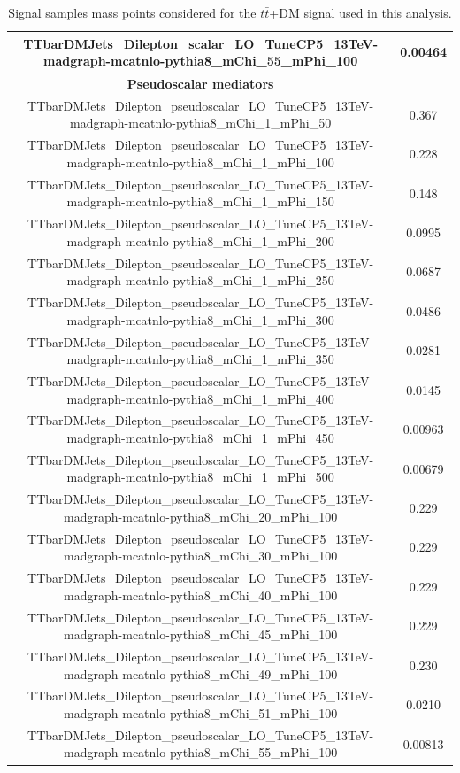 \documentclass[a4paper, 10pt, openright]{report}
\begin{document}
\begin{appendices}
\begin{table}
\begin{center}
{\begin{tabular}{ c|c }
 TTbarDMJets\_Dilepton\_scalar\_LO\_TuneCP5\_13TeV-madgraph-mcatnlo-pythia8\_mChi\_55\_mPhi\_100 & 0.00464 \\
 \hline
\textbf{Pseudoscalar mediators} & \\
 TTbarDMJets\_Dilepton\_pseudoscalar\_LO\_TuneCP5\_13TeV-madgraph-mcatnlo-pythia8\_mChi\_1\_mPhi\_50 & 0.367 \\
 TTbarDMJets\_Dilepton\_pseudoscalar\_LO\_TuneCP5\_13TeV-madgraph-mcatnlo-pythia8\_mChi\_1\_mPhi\_100 & 0.228 \\
 TTbarDMJets\_Dilepton\_pseudoscalar\_LO\_TuneCP5\_13TeV-madgraph-mcatnlo-pythia8\_mChi\_1\_mPhi\_150 & 0.148 \\
 TTbarDMJets\_Dilepton\_pseudoscalar\_LO\_TuneCP5\_13TeV-madgraph-mcatnlo-pythia8\_mChi\_1\_mPhi\_200 & 0.0995 \\
 TTbarDMJets\_Dilepton\_pseudoscalar\_LO\_TuneCP5\_13TeV-madgraph-mcatnlo-pythia8\_mChi\_1\_mPhi\_250 & 0.0687 \\
 TTbarDMJets\_Dilepton\_pseudoscalar\_LO\_TuneCP5\_13TeV-madgraph-mcatnlo-pythia8\_mChi\_1\_mPhi\_300 & 0.0486 \\
 TTbarDMJets\_Dilepton\_pseudoscalar\_LO\_TuneCP5\_13TeV-madgraph-mcatnlo-pythia8\_mChi\_1\_mPhi\_350 & 0.0281 \\
 TTbarDMJets\_Dilepton\_pseudoscalar\_LO\_TuneCP5\_13TeV-madgraph-mcatnlo-pythia8\_mChi\_1\_mPhi\_400 & 0.0145 \\
 TTbarDMJets\_Dilepton\_pseudoscalar\_LO\_TuneCP5\_13TeV-madgraph-mcatnlo-pythia8\_mChi\_1\_mPhi\_450 & 0.00963 \\
 TTbarDMJets\_Dilepton\_pseudoscalar\_LO\_TuneCP5\_13TeV-madgraph-mcatnlo-pythia8\_mChi\_1\_mPhi\_500 & 0.00679 \\
 TTbarDMJets\_Dilepton\_pseudoscalar\_LO\_TuneCP5\_13TeV-madgraph-mcatnlo-pythia8\_mChi\_20\_mPhi\_100 & 0.229 \\
 TTbarDMJets\_Dilepton\_pseudoscalar\_LO\_TuneCP5\_13TeV-madgraph-mcatnlo-pythia8\_mChi\_30\_mPhi\_100 & 0.229 \\
 TTbarDMJets\_Dilepton\_pseudoscalar\_LO\_TuneCP5\_13TeV-madgraph-mcatnlo-pythia8\_mChi\_40\_mPhi\_100 & 0.229 \\
 TTbarDMJets\_Dilepton\_pseudoscalar\_LO\_TuneCP5\_13TeV-madgraph-mcatnlo-pythia8\_mChi\_45\_mPhi\_100 & 0.229 \\
 TTbarDMJets\_Dilepton\_pseudoscalar\_LO\_TuneCP5\_13TeV-madgraph-mcatnlo-pythia8\_mChi\_49\_mPhi\_100 & 0.230 \\
 TTbarDMJets\_Dilepton\_pseudoscalar\_LO\_TuneCP5\_13TeV-madgraph-mcatnlo-pythia8\_mChi\_51\_mPhi\_100 & 0.0210 \\
 TTbarDMJets\_Dilepton\_pseudoscalar\_LO\_TuneCP5\_13TeV-madgraph-mcatnlo-pythia8\_mChi\_55\_mPhi\_100 & 0.00813 \\
 \hline
\end{tabular}
}
\caption{Signal samples mass points considered for the $t \bar t$+DM signal used in this analysis.}
\label{table:ttDMsignals}
\end{center}
\end{table}


\end{appendices}
\end{document}
